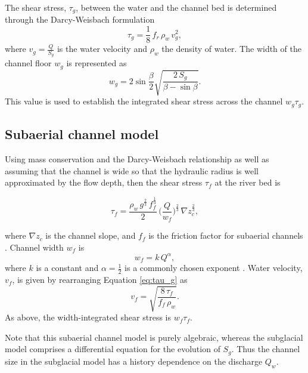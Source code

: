 \documentclass[draft]{agujournal2019}
\begin{document}
The shear stress, $\tau_g$, between the water and the channel bed is determined through the Darcy-Weisbach formulation
\begin{equation}
  \label{eq:tau_g}
  \tau_g=\frac{1}{8}\,f_r\,\rho_w\,v_g^2,
\end{equation}
%
where $v_g = \frac{Q}{S_g}$ is the water velocity and $\rho_w$ the density of water.
%
The width of the channel floor $w_g$ is represented as
\begin{equation}
  \label{eq:dh2wc}
  w_g = 2  \sin \frac{\beta}{2} \sqrt{\frac{2\, S_g}{\beta -\sin \beta}}.
\end{equation}
%
This value is used to establish the integrated shear stress across the channel $w_g\tau_g$.

\subsection{Subaerial channel  model}
\label{sect:fluv}

Using mass conservation and the Darcy-Weisbach relationship as well as assuming that the channel is wide so that the hydraulic radius is well approximated by the flow depth, then
the shear stress $\tau_f$ at the river bed is
\begin{linenomath*}
  \begin{equation}
    \label{eq:DW_tau}
    \tau_f=\frac{\rho_w\,g^{\frac{2}{3}}\,f_f^{\frac{1}{3}}}{2}\, \Big(\frac{Q}{w_f} \Big)^{\frac{2}{3}} \,\nabla z_c^{\frac{2}{3}},
  \end{equation}
\end{linenomath*}
where $\nabla z_c$ is the channel slope, and $f_f$ is the friction factor for subaerial channels \cite{tucker1997}.
Channel width $w_f$ is
\begin{equation}
  \label{eq:wcf}
  w_f = k \, Q^{\alpha},
\end{equation}
%
where $k$ is a constant and $\alpha=\frac{1}{2}$ is a commonly chosen exponent \cite{leopold1953}.
Water velocity, $v_f$, is given by rearranging Equation \ref{eq:tau_g} as
\begin{equation}
  \label{eq:vf}
  v_f = \sqrt{\frac{8\,\tau_f}{f_f\,\rho_w}}.
\end{equation}
%
As above, the width-integrated shear stress is $w_f\tau_f$.

Note that this subaerial channel model is purely algebraic, whereas the subglacial model comprises a differential equation for the evolution of $S_g$.
Thus the channel size in the subglacial model has a history dependence on the discharge $Q_w$.
\end{document}
